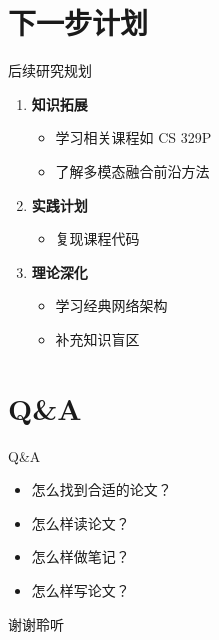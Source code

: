 \documentclass[aspectratio=169,AutoFakeBold]{beamer}
\begin{document}

\section{下一步计划}
\begin{frame}{后续研究规划}
    \begin{enumerate}
        \item \textbf{知识拓展}
            \begin{itemize}
                \item 学习相关课程如 CS 329P
                \item 了解多模态融合前沿方法
            \end{itemize}
        \item \textbf{实践计划}
            \begin{itemize}
                \item 复现课程代码
            \end{itemize}
        \item \textbf{理论深化}
            \begin{itemize}
                \item 学习经典网络架构
                \item 补充知识盲区
            \end{itemize}
    \end{enumerate}
\end{frame}


\section{Q\&A}
\begin{frame}{Q\&A}
    \begin{itemize}
            \item 怎么找到合适的论文？
            \item 怎么样读论文？
            \item 怎么样做笔记？
            \item 怎么样写论文？
        \end{itemize} 
\end{frame}

\begin{frame}
    \Background
    \begin{center}
        {\Huge\calligra 谢谢聆听}
    \end{center}
\end{frame}
\end{document}
